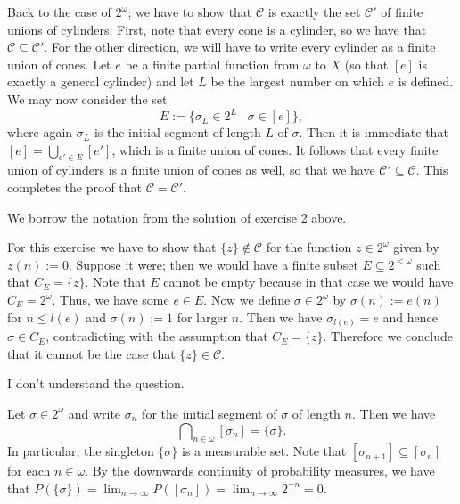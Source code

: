 \documentclass{article}
\begin{document}
\begin{ex}
Back to the case of $2^\omega$; we have to show that $\mathcal{C}$ is exactly the set $\mathcal{C}'$ of finite unions of cylinders. First, note that every cone is a cylinder, so we have that $\mathcal{C}\subseteq\mathcal{C}'$. For the other direction, we will have to write every cylinder as a finite union of cones. Let $e$ be a finite partial function from $\omega$ to $X$ (so that $[e]$ is exactly a general cylinder) and let $L$ be the largest number on which $e$ is defined. We may now consider the set
\begin{equation*}
E:=\{\sigma_L\in 2^L\mid\sigma\in[e]\},
\end{equation*}  
where again $\sigma_L$ is the initial segment of length $L$ of $\sigma$. Then it is immediate that $[e]=\bigcup_{e'\in E}[e']$, which is a finite union of cones. It follows that every finite union of cylinders is a finite union of cones as well, so that we have $\mathcal{C}'\subseteq\mathcal{C}$. This completes the proof that $\mathcal{C}=\mathcal{C}'$.  
\end{ex}

\begin{ex}
We borrow the notation from the solution of exercise 2 above.

For this exercise we have to show that $\{z\}\notin\mathcal{C}$ for the function $z\in 2^\omega$ given by $z(n):=0$. Suppose it were; then we would have a finite subset $E\subseteq 2^{<\omega}$ such that $C_E=\{z\}$. Note that $E$ cannot be empty because in that case we would have $C_E=2^\omega$. Thus, we have some $e\in E$. Now we define $\sigma\in 2^\omega$ by $\sigma(n):=e(n)$ for $n\leq l(e)$ and $\sigma(n):=1$ for larger $n$. Then we have $\sigma_{l(e)}=e$ and hence $\sigma\in C_E$, contradicting with the assumption that $C_E=\{z\}$. Therefore we conclude that it cannot be the case that $\{z\}\in\mathcal{C}$. 
\end{ex}

\begin{ex}
I don't understand the question.
\end{ex}

\begin{ex}
Let $\sigma\in 2^\omega$ and write $\sigma_n$ for the initial segment of $\sigma$ of length $n$. Then we have
\begin{equation*}
\bigcap\nolimits_{n\in\omega}[\sigma_n]=\{\sigma\}.
\end{equation*}
In particular, the singleton $\{\sigma\}$ is a measurable set. Note that $[\sigma_{n+1}]\subseteq[\sigma_n]$ for each $n\in\omega$. By the downwards continuity of probability measures, we have that $P(\{\sigma\})=\lim_{n\to\infty}P([\sigma_n])=\lim_{n\to\infty}2^{-n}=0$. 
\end{ex}
\end{document}

